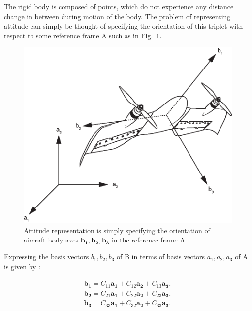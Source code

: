 The rigid body is composed of points, which do not experience any distance change in between during motion of the body. 
The problem of representing attitude can simply be thought of specifying the orientation of this triplet with respect to some reference frame A such as in Fig.~\ref{fig:theTwoFrames}.

\begin{figure}
\begin{center}
\includegraphics[width=13cm]{figures/DarkoAxesElgiz}    %
\caption{Attitude representation is simply specifying the orientation of 
aircraft body axes $\bm{b_1}, \bm{b_2}, \bm{b_3}$ in the reference frame A} 
\label{fig:theTwoFrames}
\end{center}
\end{figure}

Expressing the basis vectors $b_1, b_2, b_3$ of B in terms of basis vectors $a_1, a_2, a_3$ of A is given by :

\begin{align}
\label{eqn:C_B_A}
\begin{split}
\bm{b_1} = C_{11}\bm{a_1} + C_{12}\bm{a_2} + C_{13}\bm{a_3}  ,
\\
\bm{b_2} = C_{21}\bm{a_1} + C_{22}\bm{a_2} + C_{23}\bm{a_3}  ,
\\
\bm{b_3} = C_{33}\bm{a_1} + C_{32}\bm{a_2} + C_{33}\bm{a_3}  .
\end{split}
\end{align}

